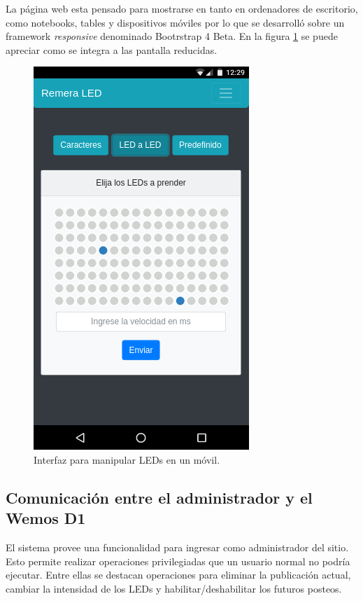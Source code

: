     La página web esta pensado para mostrarse en tanto en ordenadores de escritorio, como notebooks, tables y dispositivos móviles por lo que se desarrolló sobre un framework \emph{responsive} denominado Bootrstrap 4 Beta. En la figura \ref{fig:Web-responsive} se puede apreciar como se integra a las pantalla reducidas.

    \begin{figure}[ht!]
    	\centering
    	\begin{center}
    		\includegraphics[scale=0.7]{imagenes/web/responsive.png}
    		\caption{Interfaz para manipular LEDs en un móvil.}
    		\label{fig:Web-responsive}
    	\end{center}
    \end{figure}


    \subsection{Comunicación entre el administrador y el Wemos D1}
    El sistema provee una funcionalidad para ingresar como administrador del sitio. Esto permite realizar operaciones privilegiadas que un usuario normal no podría ejecutar. Entre ellas se destacan operaciones para eliminar la publicación actual, cambiar la intensidad de los LEDs y habilitar/deshabilitar los futuros posteos.
    
